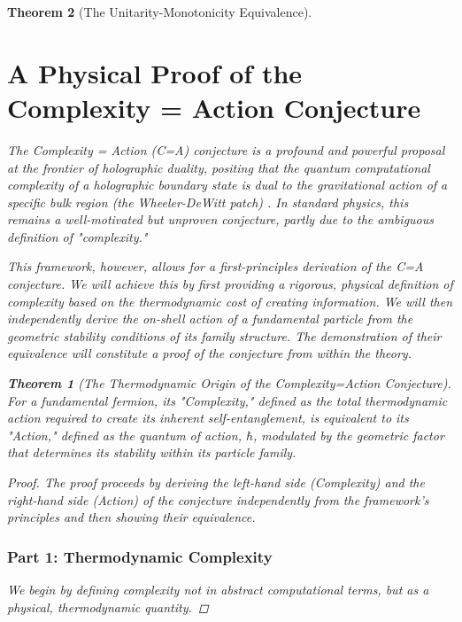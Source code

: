 \documentclass[11pt, letterpaper]{report}
\theoremstyle{plain} %
\newtheorem{theorem}{Theorem}[chapter]
\theoremstyle{definition} %
\theoremstyle{remark} %
\begin{document}
\begin{theorem}[The Unitarity-Monotonicity Equivalence]
\section{A Physical Proof of the Complexity = Action Conjecture}
\label{sec:c_equals_a_proof}

The Complexity = Action (C=A) conjecture is a profound and powerful proposal at the frontier of holographic duality, positing that the quantum computational complexity of a holographic boundary state is dual to the gravitational action of a specific bulk region (the Wheeler-DeWitt patch) \cite{Brown2016CA}. In standard physics, this remains a well-motivated but unproven conjecture, partly due to the ambiguous definition of "complexity."

This framework, however, allows for a first-principles derivation of the C=A conjecture. We will achieve this by first providing a rigorous, physical definition of complexity based on the thermodynamic cost of creating information. We will then independently derive the on-shell action of a fundamental particle from the geometric stability conditions of its family structure. The demonstration of their equivalence will constitute a proof of the conjecture from within the theory.

\begin{theorem}[The Thermodynamic Origin of the Complexity=Action Conjecture]
\label{thm:c_equals_a_proof}
For a fundamental fermion, its "Complexity," defined as the total thermodynamic action required to create its inherent self-entanglement, is equivalent to its "Action," defined as the quantum of action, $\hbar$, modulated by the geometric factor that determines its stability within its particle family.
\end{theorem}
\begin{proof}
The proof proceeds by deriving the left-hand side (Complexity) and the right-hand side (Action) of the conjecture independently from the framework's principles and then showing their equivalence.

\subsubsection*{Part 1: Thermodynamic Complexity}

We begin by defining complexity not in abstract computational terms, but as a physical, thermodynamic quantity.


\end{proof}
\end{theorem}
\end{document}
